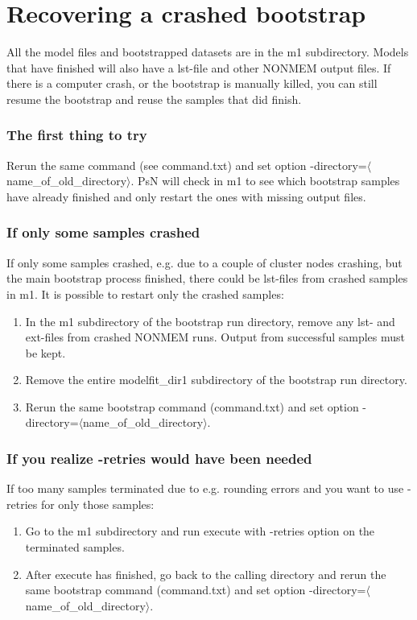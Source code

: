 \section{Recovering a crashed bootstrap}

All the model files and bootstrapped datasets are in the m1 subdirectory. Models that have finished will also have a 
lst-file and other NONMEM output files. 
If there is a computer crash, or the bootstrap is manually killed, you can still resume the bootstrap and reuse the samples that did finish. 
\subsubsection*{The first thing to try}
Rerun the same command (see command.txt) and set option 
-directory=$\langle$name\_of\_old\_directory$\rangle$. 
PsN will check in m1 to see which bootstrap samples have already finished and only restart the ones with missing output files.

\subsubsection*{If only some samples crashed}
If only some samples crashed, e.g. due to a couple of cluster nodes crashing, but the main bootstrap process finished, 
there could be lst-files from crashed samples in m1. It is possible to restart only the crashed samples:
\begin{enumerate}
	\item In the m1 subdirectory of the bootstrap run directory, remove any lst- and ext-files from crashed NONMEM runs. Output from
successful samples must be kept.
    \item Remove the entire modelfit\_dir1 subdirectory of the bootstrap run directory.
	\item Rerun the same bootstrap command (command.txt) and set option -directory=$\langle$name\_of\_old\_directory$\rangle$. 
\end{enumerate}

\subsubsection*{If you realize -retries would have been needed}
If too many samples terminated due to e.g. rounding errors and you want to use -retries for only those samples:
\begin{enumerate}
	\item Go to the m1 subdirectory and run execute with -retries option on the terminated samples.
	\item After execute has finished, go back to the calling directory and rerun the same bootstrap command 
(command.txt) and set option -directory=$\langle$name\_of\_old\_directory$\rangle$. 
\end{enumerate}

